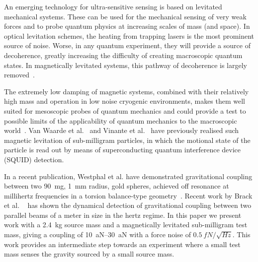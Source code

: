 \documentclass[pdflatex,sn-mathphys]{sn-jnl}
\begin{document}
    
    An emerging technology for ultra-sensitive sensing is based on levitated mechanical systems. These can be used for the mechanical sensing of very weak forces and to probe quantum physics at increasing scales of mass (and space). In optical levitation schemes, the heating from trapping lasers is the most prominent source of noise. Worse, in any quantum experiment, they will provide a source of decoherence, greatly increasing the difficulty of creating macroscopic quantum states. In magnetically levitated systems, this pathway of decoherence is largely removed~\cite{Romero2021}.
    
    
    The extremely low damping of magnetic systems, combined with their relatively high mass and operation in low noise cryogenic environments, makes them well suited for mesoscopic probes of quantum mechanics and could provide a test to possible limits of the applicability of quantum mechanics to the macroscopic world~\cite{leggett2002,arndt2014}.
    Van Waarde et al.~\cite{Waarde2016} and Vinante et al.~\cite{vinante2020} have previously realised such magnetic levitation of sub-milligram particles, in which the motional state of the particle is read out by means of superconducting quantum interference device (SQUID) detection.
    
    
    In a recent publication, Westphal et al. have demonstrated gravitational coupling between two \SI{90}{mg}, \SI{1}{mm} radius, gold spheres, achieved off resonance at millihertz frequencies in a torsion balance-type geometry~\cite{aspelmeyer2021}. Recent work by Brack et al. ~\cite{brack2022} has shown the dynamical detection of gravitational coupling between two parallel beams of a  meter in size in the hertz regime. In this paper we present work with a \SI{2.4}{kg} source mass and a magnetically levitated sub-milligram test mass, giving a coupling of \SIrange{10}{30}{aN} with a force noise of $\SI{0.5}{fN/\sqrt{Hz}}$. This work provides an intermediate step towards an experiment where a small test mass senses the gravity sourced by a small source mass.
%

%
\end{document}
